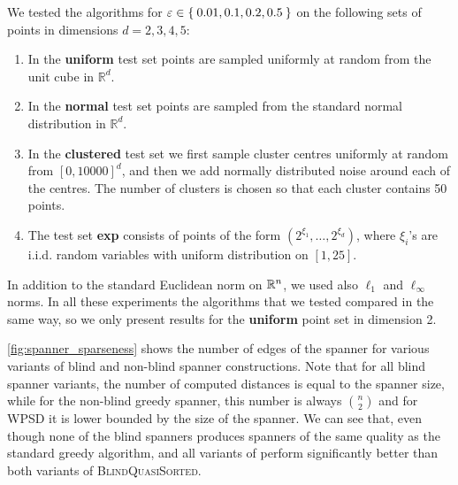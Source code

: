 
We tested the algorithms for $\varepsilon \in \Set{0.01, 0.1, 0.2, 0.5}$ on the following sets of points in dimensions $d = 2,3,4,5$:
\begin{enumerate}
    \item In the \textbf{uniform} test set points are sampled uniformly at
        random from the unit cube in $\mathbb{R}^d$.
    \item In the \textbf{normal} test set points are sampled from the standard
        normal distribution in $\mathbb{R}^d$.
    \item In the \textbf{clustered} test set we first sample cluster centres uniformly 
        at random from $[0,10000]^d$, and then we add normally distributed noise around
        each of the centres. The number of clusters is chosen so that each cluster
        contains 50 points.
    \item The test set \textbf{exp} consists of points of the form $(2^{\xi_1}, \dots, 2^{\xi_d})$,
        where $\xi_i$'s are i.i.d. random variables with uniform distribution on $[1,25]$.
\end{enumerate}
In addition to the standard Euclidean norm on $\mathbb{R}^n$, we used also $\ell_1$ and $\ell_\infty$ norms.
In all these experiments the algorithms that we tested compared in the same way,
so we only present results for the \textbf{uniform} point set in dimension 2.



\cref{fig:spanner_sparseness}
shows the number of edges of the spanner for various variants of 
blind and non-blind spanner constructions.
Note that for all blind spanner variants, the number of computed distances
is equal to the spanner size, while for the non-blind greedy spanner,
this number is always $\binom{n}{2}$ and for WPSD it is lower bounded
by the size of the spanner.
We can see that, even though none of the blind spanners produces
spanners of the same quality as the standard greedy algorithm,
\bgrdy and all variants of \brndm
perform significantly better than both variants of \textsc{BlindQuasiSorted}.




